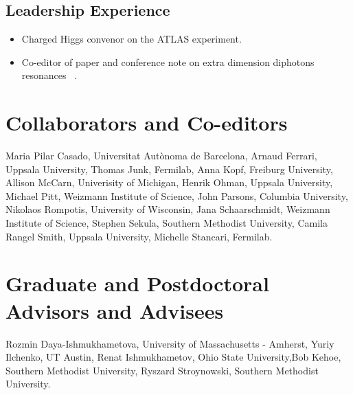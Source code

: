 \documentclass[10pt]{article}
\begin{document}
\subsection*{Leadership Experience}
\begin{itemize}
\item Charged Higgs convenor on the ATLAS experiment.
\item Co-editor of paper and conference note on extra dimension diphotons resonances ~\cite{atl1,atl1-conf}.

\end{itemize}

\section*{Collaborators and Co-editors}
Maria Pilar Casado, Universitat Autònoma de Barcelona, Arnaud Ferrari, Uppsala University, Thomas Junk, Fermilab, Anna Kopf, Freiburg University, Allison McCarn, Univerisity of Michigan, Henrik Ohman, Uppsala University,
Michael Pitt, Weizmann Institute of Science, John Parsons, Columbia University, Nikolaos Rompotis, University of Wisconsin, Jana Schaarschmidt, Weizmann Institute of Science, Stephen Sekula, Southern Methodist University,
Camila Rangel Smith, Uppsala University, Michelle Stancari, Fermilab.

\section*{Graduate and Postdoctoral Advisors and Advisees}
Rozmin Daya-Ishmukhametova, University of Massachusetts - Amherst, Yuriy Ilchenko, UT Austin, Renat Ishmukhametov, Ohio State University,Bob Kehoe, 
Southern Methodist University, Ryszard Stroynowski, Southern Methodist University.
\end{document}
